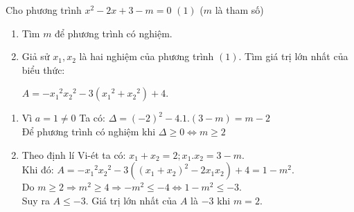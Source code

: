 \begin{ex}%
Cho phương trình  ${x^2} - 2x + 3 - m = 0$ $(1)$ ($m$ là tham số)
    \begin{enumerate}
        \item Tìm $m$ để phương trình có nghiệm.
        \item Giả sử $x_1,x_2$ là hai nghiệm của phương trình $(1)$. Tìm giá trị lớn nhất của biểu thức:
            \begin{center}$A =  - {x_1}^2{x_2}^2 - 3\left( {{x_1}^2 + {x_2}^2} \right) + 4$.
            \end{center}
    \end{enumerate}
\loigiai
    {
    \begin{enumerate}
        \item  Vì $a=1 \neq 0$ Ta có: $\Delta =(-2)^2-4.1.(3-m)=m-2$\\
        Để phương trình có nghiệm khi $\Delta \geq 0 \Leftrightarrow m \geq 2$
        \item Theo định lí Vi-ét ta có: $x_1+x_2=2;x_1.x_2=3-m$.\\
        Khi đó: $A =  - {x_1}^2{x_2}^2 - 3\left( {{{\left( {{x_1} + {x_2}} \right)}^2} - 2{x_1}{x_2}} \right) + 4 = 1 - {m^2}$.\\
        Do $m\geq 2 \Rightarrow m^2\geq 4 \Rightarrow -m^2 \leq -4 \Leftrightarrow 1-m^2 \leq -3$.\\
        Suy ra $A \leq -3$. Giá trị lớn nhất của $A$ là $-3$ khi $m=2$.
    \end{enumerate}
    }
\end{ex}

